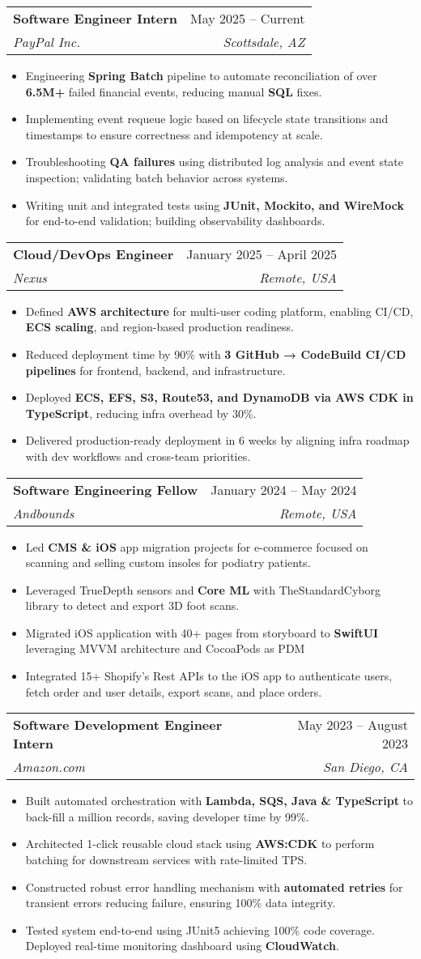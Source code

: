 \documentclass[letterpaper,11pt]{article}
\makeatletter
\newcommand{\resumeItem}[1]{
  \item\small{\fontsize{10}{11}\selectfont
    {#1 \vspace{-1pt}}
  }
}
\newcommand{\resumeSubheading}[4]{
  \vspace{-0pt}\item
    \begin{tabular*}{0.97\textwidth}[t]{l@{\extracolsep{\fill}}r}
      \textbf{#1} & #2 \\
      \textit{#3} & \textit{#4} \\ 
    \end{tabular*}\vspace{-6pt}
}
\newcommand{\resumeItemListStart}{\begin{itemize}[leftmargin=0.20in]}
\newcommand{\resumeItemListEnd}{\end{itemize}\vspace{-6pt}}
\makeatother
\begin{document}
    \resumeSubheading
    {Software Engineer Intern}{May 2025 -- Current}
    {PayPal Inc.}{Scottsdale, AZ}
    \resumeItemListStart
        \resumeItem{Engineering \textbf{Spring Batch} pipeline to automate reconciliation of over \textbf{6.5M+} failed financial events, reducing manual \textbf{SQL} fixes.}
        \resumeItem{Implementing event requeue logic based on lifecycle state transitions and timestamps to ensure correctness and idempotency at scale.}
        \resumeItem{Troubleshooting \textbf{QA failures} using distributed log analysis and event state inspection; validating batch behavior across systems.}
        \resumeItem{Writing unit and integrated tests using \textbf{JUnit, Mockito, and WireMock} for end-to-end validation; building observability dashboards.}
    \resumeItemListEnd
    
    \resumeSubheading
    {Cloud/DevOps Engineer}{January 2025 -- April 2025}
    {Nexus}{Remote, USA}
    \resumeItemListStart
        \resumeItem{Defined \textbf{AWS architecture} for multi-user coding platform, enabling CI/CD, \textbf{ECS scaling}, and region-based production readiness.}
        \resumeItem{Reduced deployment time by 90\% with \textbf{3 GitHub → CodeBuild CI/CD pipelines} for frontend, backend, and infrastructure.}
        \resumeItem{Deployed \textbf{ECS, EFS, S3, Route53, and DynamoDB via AWS CDK in TypeScript}, reducing infra overhead by 30\%.}
        \resumeItem{Delivered production-ready deployment in 6 weeks by aligning infra roadmap with dev workflows and cross-team priorities.}
    \resumeItemListEnd

    \resumeSubheading
    {Software Engineering Fellow}{January 2024 -- May 2024}
    {Andbounds}{Remote, USA}
    \resumeItemListStart
        \resumeItem{Led \textbf{CMS \& iOS} app migration projects for e-commerce focused on scanning and selling custom insoles for podiatry patients.}
        \resumeItem{Leveraged TrueDepth sensors and \textbf{Core ML} with TheStandardCyborg library to detect and export 3D foot scans.}
        \resumeItem{Migrated iOS application with 40+ pages from storyboard to \textbf{SwiftUI} leveraging MVVM architecture and CocoaPods as PDM}
        \resumeItem{Integrated 15+ Shopify's Rest APIs to the iOS app to authenticate users, fetch order and user details, export scans, and place orders.}
    \resumeItemListEnd
    
    \resumeSubheading
    {Software Development Engineer Intern}{May 2023 -- August 2023}
    {Amazon.com}{San Diego, CA}
    \resumeItemListStart
        \resumeItem{Built automated orchestration with \textbf{Lambda, SQS, Java \& TypeScript} to back-fill a million records, saving developer time by 99\%.}
        \resumeItem{Architected 1-click reusable cloud stack using \textbf{AWS:CDK} to perform batching for downstream services with rate-limited TPS.}
        \resumeItem{Constructed robust error handling mechanism with \textbf{automated retries} for transient errors reducing failure, ensuring 100\% data integrity.}
        \resumeItem{Tested system end-to-end using JUnit5 achieving 100\% code coverage. Deployed real-time monitoring dashboard using \textbf{CloudWatch}.}
    \resumeItemListEnd
    
\end{document}
